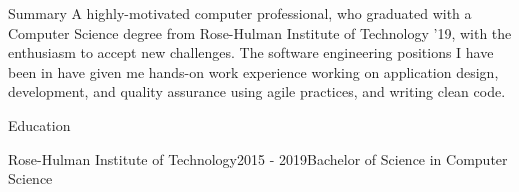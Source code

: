 \documentclass{resume} %
\begin{document}
\begin{rSection}{Summary}
{A highly-motivated computer professional, who graduated with a Computer Science degree from Rose-Hulman Institute of Technology '19, 
with the enthusiasm to accept new challenges. The software engineering positions I have been in have given me hands-on work experience 
working on application design, development, and quality assurance using agile practices, and writing clean code.}
\end{rSection}

\begin{rSection}{Education}
\begin{rsemisection}{Rose-Hulman Institute of Technology}{2015 - 2019}{Bachelor of Science in Computer Science}
\end{rsemisection}
\end{rSection}
\end{document}
